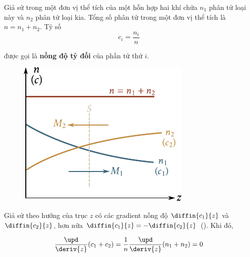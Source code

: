Giả sử trong một đơn vị thể tích của một hỗn hợp hai khí chứa $n_1$ phân tử loại này và $n_2$ phân tử loại kia. Tổng số phân tử trong một đơn vị thể tích là $n=n_1+n_2$. Tỷ số
\begin{equation*}
    c_i = \frac{n_i}{n}
\end{equation*}

được gọi là \textbf{nồng độ tỷ đối} của phần tử thứ $i$.

\begin{figure}[!htb]
	\begin{center}
		\includegraphics[scale=1]{figures/ch_16/fig_16_1.pdf}
		\caption[]{}
		\label{fig:16_1}
	\end{center}
\end{figure}

Giả sử theo hướng của trục $z$ có các gradient nồng độ $\diffin{c_1}{z}$ và $\diffin{c_2}{z}$, hơn nữa $\diffin{c_1}{z}=-\diffin{c_2}{z}$ (). Khi đó,

\begin{equation*}
    \frac{\upd}{\deriv{z}}(c_1 + c_2) = \frac{1}{n}\frac{\upd}{\deriv{z}}(n_1 + n_2) = 0
\end{equation*}


